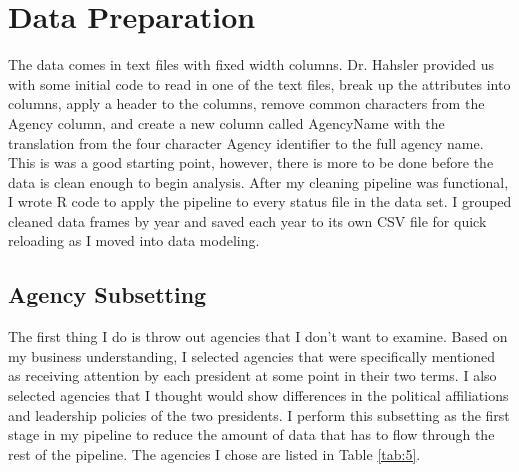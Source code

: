 \documentclass{article}
\begin{document}
\section{Data Preparation}
The data comes in text files with fixed width columns. Dr. Hahsler provided us with some initial code to read in one of the text files, break up the attributes into columns, apply a header to the columns, remove common characters from the Agency column, and create a new column called AgencyName with the translation from the four character Agency identifier to the full agency name. This is was a good starting point, however, there is more to be done before the data is clean enough to begin analysis. After my cleaning pipeline was functional, I wrote R code to apply the pipeline to every status file in the data set. I grouped cleaned data frames by year and saved each year to its own CSV file for quick reloading as I moved into data modeling.

    \subsection{Agency Subsetting}
    The first thing I do is throw out agencies that I don't want to examine. Based on my business understanding, I selected agencies that were specifically mentioned as receiving attention by each president at some point in their two terms. I also selected agencies that I thought would show differences in the political affiliations and leadership policies of the two presidents. I perform this subsetting as the first stage in my pipeline to reduce the amount of data that has to flow through the rest of the pipeline. The agencies I chose are listed in Table \ref{tab:5}.
\end{document}
